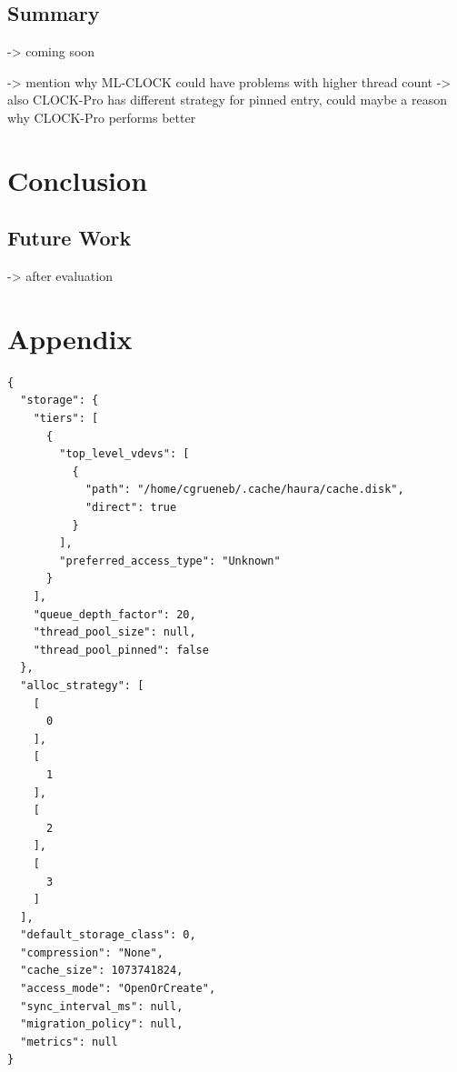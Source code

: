 \documentclass[
	12pt,
	a4paper,
	abstract,
	bibliography=totoc,
	chapterprefix,
	headings=openright,
	numbers=endperiod,
	parskip=half,
	twoside,
]{scrreprt}
\begin{document}
\section{Summary}

-> coming soon

-> mention why ML-CLOCK could have problems with higher thread count
-> also CLOCK-Pro has different strategy for pinned entry, could maybe a reason why CLOCK-Pro performs better 

\chapter{Conclusion}
\label{cha:conclusion}

\section{Future Work}

-> after evaluation








\appendix

\chapter{Appendix}
\label{cha:appendix}


\begin{lstlisting}[mathescape=true,caption=Haura configuration file for benchmark runs,label=lst:configuration haura]
{
  "storage": {
    "tiers": [
      {
        "top_level_vdevs": [
          {
            "path": "/home/cgrueneb/.cache/haura/cache.disk",
            "direct": true
          }
        ],
        "preferred_access_type": "Unknown"
      }
    ],
    "queue_depth_factor": 20,
    "thread_pool_size": null,
    "thread_pool_pinned": false
  },
  "alloc_strategy": [
    [
      0
    ],
    [
      1
    ],
    [
      2
    ],
    [
      3
    ]
  ],
  "default_storage_class": 0,
  "compression": "None",
  "cache_size": 1073741824,
  "access_mode": "OpenOrCreate",
  "sync_interval_ms": null,
  "migration_policy": null,
  "metrics": null
}

\end{lstlisting}
\end{document}
